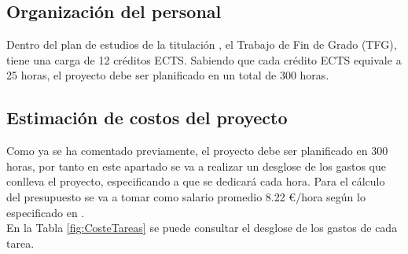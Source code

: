 \subsection{Organización del personal}
Dentro del plan de estudios de la titulación \cite{unknown-author-no-dateC}, el Trabajo de Fin de Grado (TFG), tiene una carga de 12 créditos ECTS. Sabiendo que cada crédito ECTS equivale a 25 horas, el proyecto debe ser planificado en un total de 300 horas.\\


\subsection{Estimación de costos del proyecto}
\label{Costos}

Como ya se ha comentado previamente, el proyecto debe ser planificado en 300 horas, por tanto en este apartado se va a realizar un desglose de los gastos que conlleva el proyecto, especificando a que se dedicará cada hora. Para el cálculo del presupuesto se va a tomar como salario promedio 8.22 €/hora según lo especificado en \cite{unknown-author-2021C}.\\ En la Tabla \ref{fig:CosteTareas} se puede consultar el desglose de los gastos de cada tarea.

